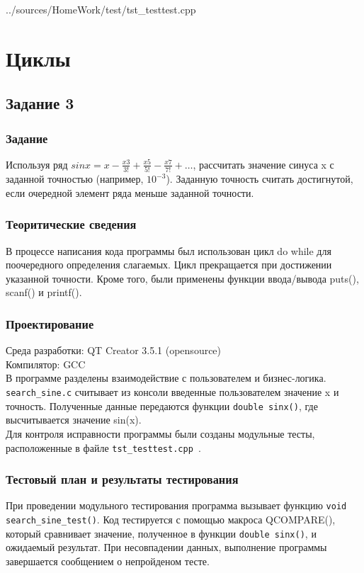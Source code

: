 \documentclass[12pt,a4paper]{report}
\begin{document}

{../sources/HomeWork/test/tst_testtest.cpp}

\chapter{Циклы}
\section{Задание 3}
\subsection{Задание}
Используя ряд $sin x = x - \frac{x3}{3!} + \frac{x5}{5!} - \frac{x7}{7!} + …$, рассчитать значение синуса x с заданной точностью (например, $10^{-3}$). Заданную точность считать достигнутой, если очередной элемент ряда меньше заданной точности.

\subsection{Теоритические сведения}
В процессе написания кода программы был использован цикл do while для поочередного определения слагаемых. Цикл прекращается при достижении указанной точности. Кроме того, были применены функции ввода/вывода puts(), scanf() и printf().
  
\subsection{Проектирование}
Среда разработки: QT Creator 3.5.1 (opensource)
\\
Компилятор: GCC
\\
В программе разделены взаимодействие с пользователем и бизнес-логика. \verb+search_sine.c+ считывает из консоли введенные пользователем значение x и точность. Полученные данные передаются функции \verb+double sinx()+, где высчитывается значение sin(x).
\\
Для контроля исправности программы были созданы модульные тесты, расположенные в файле \verb+tst_testtest.cpp +.


\subsection{Тестовый план и результаты тестирования}
При проведении модульного тестирования программа вызывает функцию \verb+void search_sine_test()+. Код тестируется с помощью макроса QCOMPARE(), который сравнивает значение, полученное в функции \verb+double sinx()+, и ожидаемый результат. При несовпадении данных, выполнение программы завершается сообщением о непройденом тесте.
\end{document}
